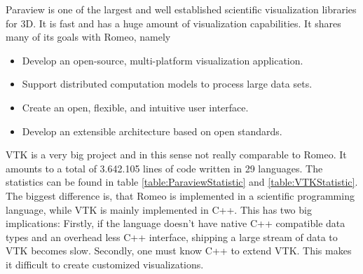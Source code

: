 Paraview is one of the largest and well established scientific visualization libraries for 3D.
It is fast and has a huge amount of visualization capabilities. It shares many of its goals with Romeo, namely \cite{Paraview}
\begin{itemize}
	\item Develop an open-source, multi-platform visualization application.
	\item Support distributed computation models to process large data sets.
	\item Create an open, flexible, and intuitive user interface.
	\item Develop an extensible architecture based on open standards.
\end{itemize}
VTK is a very big project and in this sense not really comparable to Romeo.
It amounts to a total of 3.642.105 lines of code written in 29 languages. The statistics can be found in table \ref{table:ParaviewStatistic} and \ref{table:VTKStatistic}.
The biggest difference is, that Romeo is implemented in a scientific programming language, while VTK is mainly implemented in C++.
This has two big implications:
Firstly, if the language doesn't have native C++ compatible data types and an overhead less C++ interface, shipping a large stream of data to VTK becomes slow.
Secondly, one must know C++ to extend VTK. This makes it difficult to create customized visualizations.